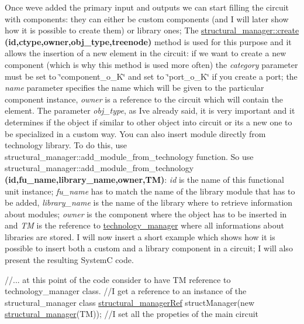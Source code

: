 \begin{DoxyItemize}
\item Once we\textquotesingle{}ve added the primary input and outputs we can start filling the circuit with components\+: they can either be custom components (and I will later show how it is possible to create them) or library ones; The \hyperlink{classstructural__manager_a06768a4a0fd1f26e78cbd1186c433261}{structural\+\_\+manager\+::create} {\bfseries (id,ctype,owner,obj\+\_\+type,treenode)} method is used for this purpose and it allows the insertion of a new element in the circuit\+: if we want to create a new component (which is why this method is used more often) the {\itshape category} parameter must be set to \char`\"{}component\+\_\+o\+\_\+\+K\char`\"{} and set to \char`\"{}port\+\_\+o\+\_\+\+K\char`\"{} if you create a port; the {\itshape name} parameter specifies the name which will be given to the particular component instance, {\itshape owner} is a reference to the circuit which will contain the element. The parameter {\itshape obj\+\_\+type}, as I\textquotesingle{}ve already said, it is very important and it determines if the object if similar to other object into circuit or it\textquotesingle{}s a new one to be specialized in a custom way. You can also insert module directly from technology library. To do this, use structural\+\_\+manager\+::add\+\_\+module\+\_\+from\+\_\+technology function. So use structural\+\_\+manager\+::add\+\_\+module\+\_\+from\+\_\+technology {\bfseries (id,fu\+\_\+name,library\+\_\+name,owner,TM)}\+: {\itshape id} is the name of this functional unit instance; {\itshape fu\+\_\+name} has to match the name of the library module that has to be added, {\itshape library\+\_\+name} is the name of the library where to retrieve information about modules; {\itshape owner} is the component where the object has to be inserted in and {\itshape TM} is the reference to \hyperlink{classtechnology__manager}{technology\+\_\+manager} where all informations about libraries are stored. I will now insert a short example which shows how it is possible to insert both a custom and a library component in a circuit; I will also present the resulting SystemC code. 
\begin{DoxyCode}
\textcolor{comment}{//... at this point of the code consider to have TM reference to technology\_manager class.}
\textcolor{comment}{//I get a reference to an instance of the structural\_manager class}
\hyperlink{structrefcount}{structural\_managerRef} structManager(\textcolor{keyword}{new} \hyperlink{classstructural__manager}{structural\_manager}(TM));
\textcolor{comment}{//I set all the propeties of the main circuit}

\end{DoxyCode}
\end{DoxyItemize}
